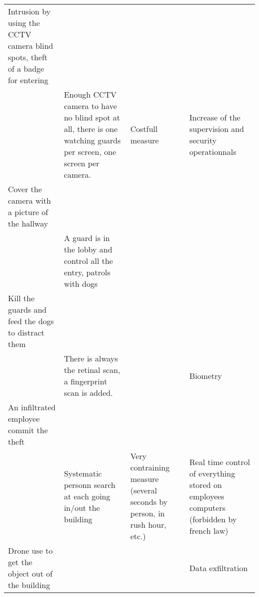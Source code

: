 \documentclass[11pt]{article} %
\begin{document}
\begin{longtable}{|p{3cm}|p{3cm}|p{3cm}|p{3cm}|}
Intrusion by using the CCTV camera blind spots, theft of a badge for entering & & & \\
& Enough CCTV camera to have no blind spot at all, there is one watching
 guards per screen, one screen per camera. & Costfull measure 
 & Increase of the supervision and security operationnals \\
Cover the camera with a picture of the hallway & & & \\
& A guard is in the lobby and control all the entry, patrols with dogs && \\
Kill the guards and feed the dogs to distract them & & & \\
& There is always the retinal scan, a fingerprint scan is added. & & Biometry \\
 An infiltrated employee commit the theft & & & \\
& Systematic personn search at each going in/out the building &
Very contraining measure (several seconds by person, in rush hour, etc.) &
Real time control of everything stored on employees computers (forbidden by 
french law) \\
Drone use to get the object out of the building & & & Data exfiltration \\

\end{longtable}
\end{document}
